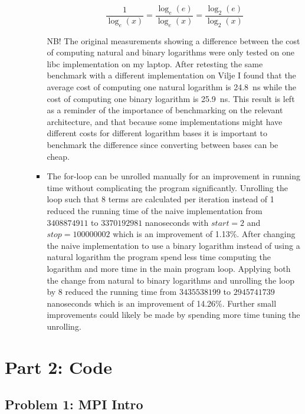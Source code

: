 \begin{enumerate}
\begin{enumerate}
\begin{itemize}
\begin{displaymath}
\frac{1}{\log_{e}(x)} = \frac{\log_{e}(e)}{\log_{e}(x)} = \frac{\log_{2}(e)}{\log_{2}(x)}
\end{displaymath}

NB! The original measurements showing a difference between the cost of computing natural and binary logarithms were only tested on one libc implementation on my laptop. After retesting the same benchmark with a different implementation on Vilje I found that the average cost of computing one natural logarithm is 24.8~ns while the cost of computing one binary logarithm is 25.9~ns. This result is left as a reminder of the importance of benchmarking on the relevant architecture, and that because some implementations might have different costs for different logarithm bases it is important to benchmark the difference since converting between bases can be cheap. 

\item The for-loop can be unrolled manually for an improvement in running time without complicating the program significantly. Unrolling the loop such that 8 terms are calculated per iteration instead of 1 reduced the running time of the naive implementation from $3408874911$ to $3370192981$ nanoseconds with $start=2$ and $stop=100000002$ which is an improvement of 1.13\%. After changing the naive implementation to use a binary logarithm instead of using a natural logarithm the program spend less time computing the logarithm and more time in the main program loop. Applying both the change from natural to binary logarithms and unrolling the loop by 8 reduced the running time from $3435538199$ to $2945741739$ nanoseconds which is an improvement of 14.26\%. Further small improvements could likely be made by spending more time tuning the unrolling.

\end{itemize}

\end{enumerate}

\end{enumerate}

\section*{Part 2: Code}

\subsection*{Problem 1: MPI Intro}


